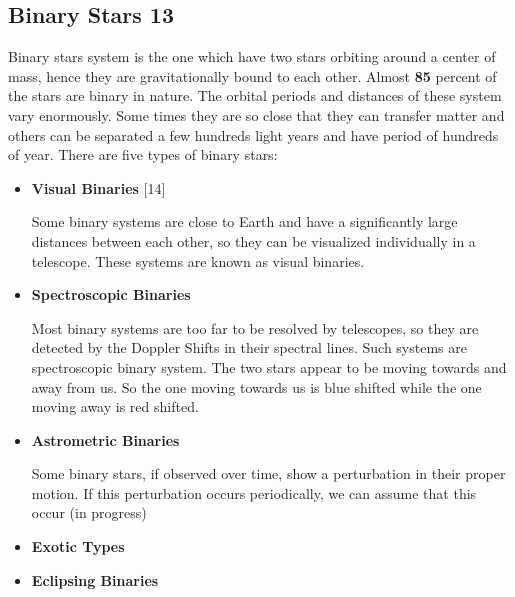 \documentclass{article}
\begin{document}
\subsection*{Binary Stars 13}
Binary stars system is the one which have two stars orbiting around a center of mass, hence they are gravitationally bound to each other. Almost \textbf{85} percent of the stars are binary in nature. The orbital periods and distances of these system vary enormously. Some times they are so close that they can transfer matter and others can be separated a few hundreds light years and have period of hundreds of year. There are five types of binary stars: 
\begin{itemize}
\item \textbf{Visual Binaries} [14]

  Some binary systems are close to Earth and have a significantly large distances between each    other, so they can be visualized individually in a telescope. These systems are known as visual binaries. 
\item \textbf{Spectroscopic Binaries }

Most binary systems are too far to be resolved by telescopes, so they are detected by the Doppler Shifts in their spectral lines. Such systems are spectroscopic binary system. The two stars appear to be moving towards and away from us. So the one moving towards us is blue shifted while the one moving away is red shifted.


\item\textbf{ Astrometric Binaries}

Some binary stars, if observed over time, show a perturbation in their proper motion. If this perturbation occurs periodically, we can assume that this occur (in progress)
\item \textbf{Exotic Types}

\item \textbf{Eclipsing Binaries}
\end{itemize}
  
\end{document}
